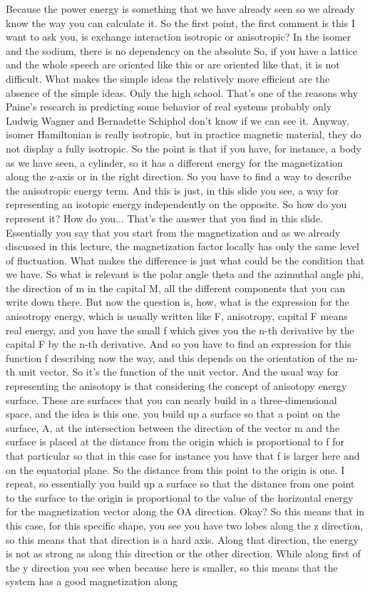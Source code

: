 Because the power energy is something that we have already seen so we already know the way you can calculate it. So the first point, the first comment is this I want to ask you, is exchange interaction isotropic or anisotropic? In the isomer and the sodium, there is no dependency on the absolute So, if you have a lattice and the whole speech are oriented like this or are oriented like that, it is not difficult. What makes the simple ideas the relatively more efficient are the absence of the simple ideas. Only the high school. That's one of the reasons why Paine's research in predicting some behavior of real systems probably only Ludwig Wagner and Bernadette Schiphol don't know if we can see it. Anyway, isomer Hamiltonian is really isotropic, but in practice magnetic material, they do not display a fully isotropic. So the point is that if you have, for instance, a body as we have seen, a cylinder, so it has a different energy for the magnetization along the z-axis or in the right direction. So you have to find a way to describe the anisotropic energy term. And this is just, in this slide you see, a way for representing an isotopic energy independently on the opposite. So how do you represent it? How do you... That's the answer that you find in this slide. Essentially you say that you start from the magnetization and as we already discussed in this lecture, the magnetization factor locally has only the same level of fluctuation. What makes the difference is just what could be the condition that we have. So what is relevant is the polar angle theta and the azimuthal angle phi, the direction of m in the capital M, all the different components that you can write down there. But now the question is, how, what is the expression for the anisotropy energy, which is usually written like F, anisotropy, capital F means real energy, and you have the small f which gives you the n-th derivative by the capital F by the n-th derivative. And so you have to find an expression for this function f describing now the way, and this depends on the orientation of the m-th unit vector. So it's the function of the unit vector. And the usual way for representing the anisotopy is that considering the concept of anisotopy energy surface. These are surfaces that you can nearly build in a three-dimensional space, and the idea is this one. you build up a surface so that a point on the surface, A, at the intersection between the direction of the vector m and the surface is placed at the distance from the origin which is proportional to f for that particular so that in this case for instance you have that f is larger here and on the equatorial plane. So the distance from this point to the origin is one. I repeat, so essentially you build up a surface so that the distance from one point to the surface to the origin is proportional to the value of the horizontal energy for the magnetization vector along the OA direction. Okay? So this means that in this case, for this specific shape, you see you have two lobes along the z direction, so this means that that direction is a hard axis. Along that direction, the energy is not as strong as along this direction or the other direction. While along first of the y direction you see when because here is smaller, so this means that the system has a good magnetization along 